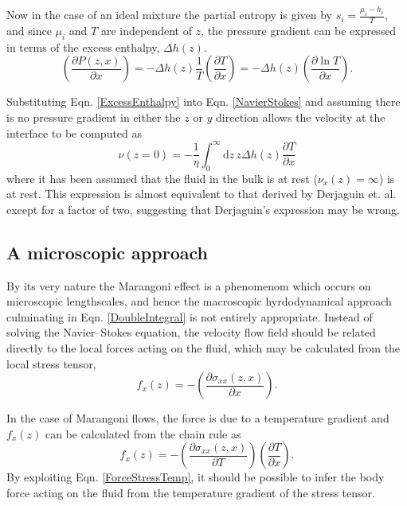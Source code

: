Now in the case of an ideal mixture the partial entropy is given by $s_{i}=\frac{\mu_{i}-h_{i}}{T}$, and since $\mu_{i}$ and $T$ are independent of $z$, the pressure gradient can be expressed in terms of the excess enthalpy, $\Delta h(z)$.
\begin{equation}
\label{ExcessEnthalpy}
\left(\frac{\partial P(z,x)}{\partial x}\right)= - \Delta h(z)\frac{1}{T} \left( \frac{\partial T}{\partial x} \right) 
= - \Delta h(z) \left( \frac{\partial \ln T}{\partial x} \right).
\end{equation}

Substituting Eqn. \ref{ExcessEnthalpy} into Eqn. \ref{NavierStokes} and assuming there is no pressure gradient in either the $z$ or $y$ direction allows the velocity at the interface to be computed as
\begin{equation}
\label{DoubleIntegral}
\nu (z=0) = - \frac{1}{\eta}\int_{0}^{\infty} \mathrm{d}z\, z \Delta h(z) \frac{\partial T}{\partial x}
\end{equation}
where it has been assumed that the fluid in the bulk is at rest ($\nu_{x}(z)=\infty$) is at rest.
This expression is almost equivalent to that derived by Derjaguin et. al. except for a factor of two, suggesting that Derjaguin's expression may be wrong.\cite{SurfaceForces, Anderson}

\subsection{A microscopic approach}
By its very nature the Marangoni effect is a phenomenom which occurs on microscopic lengthscales, and hence the macroscopic hyrdodynamical approach culminating in Eqn. \ref{DoubleIntegral} is not entirely appropriate.
Instead of solving the Navier--Stokes equation, the velocity flow field should be  related directly to the local forces acting on the fluid, which may be calculated from the local stress tensor,
\begin{equation}
\label{ForceStress}
f_{x}(z) = - \left( \frac{\partial \sigma_{xx}(z,x)}{\partial x} \right).
\end{equation}

In the case of Marangoni flows, the force is due to a temperature gradient and $f_{x}(z)$ can be calculated from the chain rule as
\begin{equation}
\label{ForceStressTemp}
f_{x}(z) = - \left( \frac{\partial \sigma_{xx}(z,x)}{\partial T} \right) \left( \frac{\partial T}{\partial x} \right).
\end{equation}
By exploiting Eqn. \ref{ForceStressTemp}, it should be possible to infer the body force acting on the fluid from the temperature gradient of the stress tensor.


